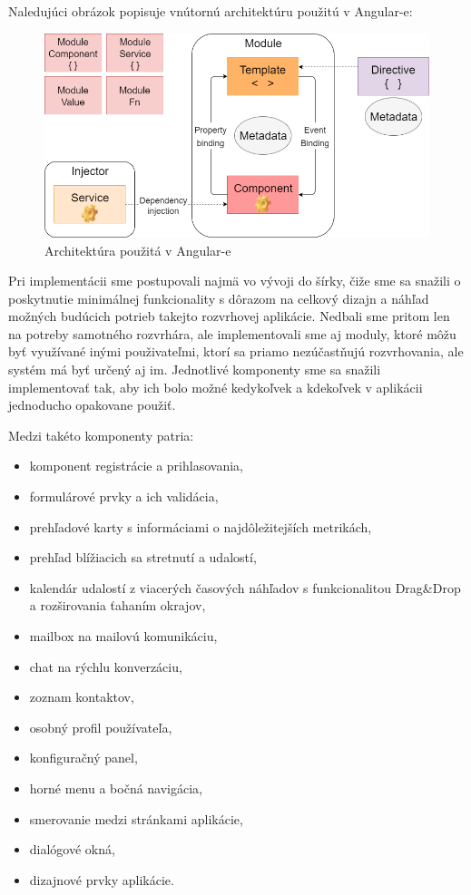 Naledujúci obrázok popisuje vnútornú architektúru použitú v Angular-e:
\begin{figure}[ht]
  \centering
  \includegraphics[width=0.8\columnwidth]{img/architecture_ang.png}
  \caption{\label{fig:architecture_ang} Architektúra použitá v Angular-e \cite{angular}}
\end{figure}

Pri implementácii sme postupovali najmä vo vývoji do šírky, čiže sme sa snažili o poskytnutie
minimálnej funkcionality s dôrazom na celkový dizajn a náhľad možných budúcich potrieb takejto
rozvrhovej aplikácie. Nedbali sme pritom len na potreby samotného rozvrhára, ale implementovali
sme aj moduly, ktoré môžu byť využívané inými použivateľmi, ktorí sa priamo nezúčastňujú 
rozvrhovania, ale systém má byť určený aj im. Jednotlivé komponenty sme sa snažili implementovať
tak, aby ich bolo možné kedykoľvek a kdekoľvek v aplikácii jednoducho opakovane použiť.

Medzi takéto komponenty patria:

\begin{itemize}
\item komponent registrácie a prihlasovania,
\item formulárové prvky a ich validácia,
\item prehľadové karty s informáciami o najdôležitejších metrikách,
\item prehľad blížiacich sa stretnutí a udalostí,
\item kalendár udalostí z viacerých časových náhľadov s funkcionalitou Drag\&Drop
a rozširovania ťahaním okrajov,
\item mailbox na mailovú komunikáciu,
\item chat na rýchlu konverzáciu,
\item zoznam kontaktov,
\item osobný profil používateľa,
\item konfiguračný panel,
\item horné menu a bočná navigácia,
\item smerovanie medzi stránkami aplikácie,
\item dialógové okná,
\item dizajnové prvky aplikácie.
\end{itemize}

